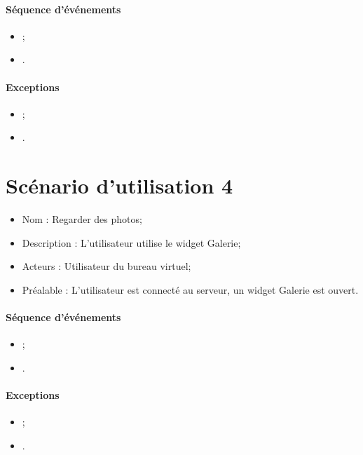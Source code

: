 \paragraph{Séquence d'événements}
\begin{itemize}
	\item;
	\item .
\end{itemize}

\paragraph{Exceptions}
\begin{itemize}
	\item;
	\item .
\end{itemize}


\section{Scénario d'utilisation 4}
\begin{itemize}
	\item Nom : Regarder des photos;
	\item Description : L'utilisateur utilise le widget Galerie;
	\item Acteurs : Utilisateur du bureau virtuel;
	\item Préalable : L'utilisateur est connecté au serveur, un widget Galerie est ouvert.
\end{itemize}

\paragraph{Séquence d'événements}
\begin{itemize}
	\item;
	\item .
\end{itemize}

\paragraph{Exceptions}
\begin{itemize}
	\item;
	\item .
\end{itemize}


